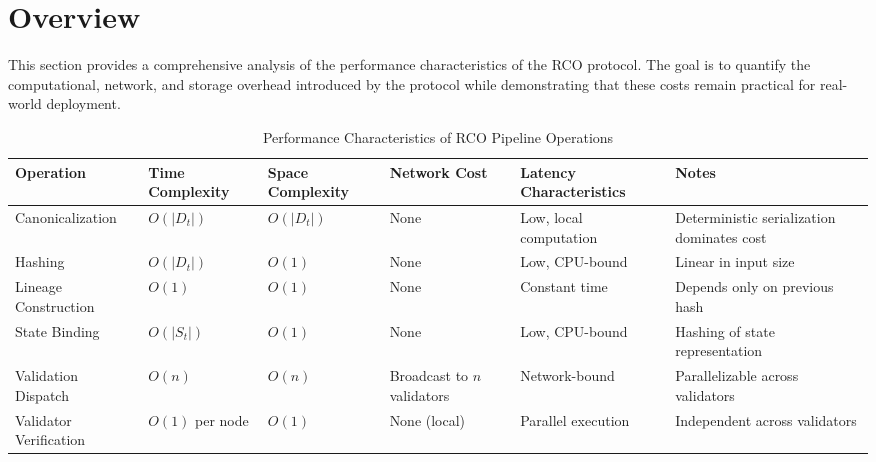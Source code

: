 \section{Overview}

This section provides a comprehensive analysis of the performance characteristics of the RCO protocol. The goal is to quantify the computational, network, and storage overhead introduced by the protocol while demonstrating that these costs remain practical for real-world deployment.

\begin{table}[htbp]
\footnotesize
\centering
\caption{Performance Characteristics of RCO Pipeline Operations}
\label{tab:performance}

\renewcommand{\arraystretch}{1.25}

\begin{tabularx}{\textwidth}{|p{3cm}|p{2.5cm}|p{2.5cm}|X|X|X|}
\hline
\textbf{Operation} & \textbf{Time Complexity} & \textbf{Space Complexity} & \textbf{Network Cost} & \textbf{Latency Characteristics} & \textbf{Notes} \\
\hline

Canonicalization & $O(|D_t|)$ & $O(|D_t|)$ & None & Low, local computation & Deterministic serialization dominates cost \\

\hline

Hashing & $O(|D_t|)$ & $O(1)$ & None & Low, CPU-bound & Linear in input size \\

\hline

Lineage Construction & $O(1)$ & $O(1)$ & None & Constant time & Depends only on previous hash \\

\hline

State Binding & $O(|S_t|)$ & $O(1)$ & None & Low, CPU-bound & Hashing of state representation \\

\hline

Validation Dispatch & $O(n)$ & $O(n)$ & Broadcast to $n$ validators & Network-bound & Parallelizable across validators \\

\hline

Validator Verification & $O(1)$ per node & $O(1)$ & None (local) & Parallel execution & Independent across validators \\

\hline


\end{tabularx}
\end{table}
